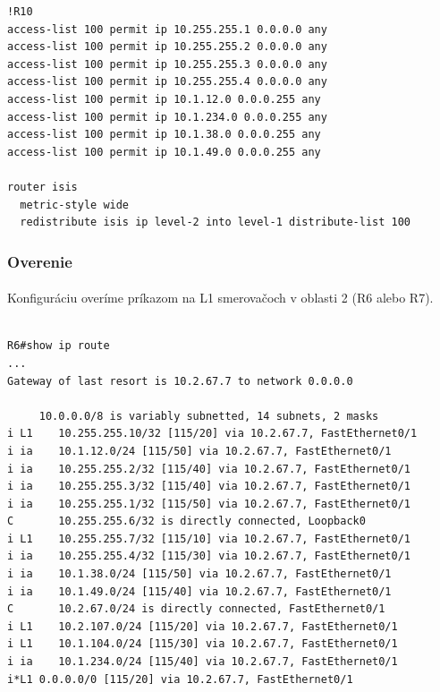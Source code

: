\documentclass[12pt,twoside,a4paper]{report}
\begin{document}
\noindent
{\selectfont
\begin{small}
\begin{verbatim}
!R10
access-list 100 permit ip 10.255.255.1 0.0.0.0 any
access-list 100 permit ip 10.255.255.2 0.0.0.0 any
access-list 100 permit ip 10.255.255.3 0.0.0.0 any
access-list 100 permit ip 10.255.255.4 0.0.0.0 any
access-list 100 permit ip 10.1.12.0 0.0.0.255 any
access-list 100 permit ip 10.1.234.0 0.0.0.255 any
access-list 100 permit ip 10.1.38.0 0.0.0.255 any
access-list 100 permit ip 10.1.49.0 0.0.0.255 any

router isis
  metric-style wide
  redistribute isis ip level-2 into level-1 distribute-list 100
\end{verbatim}
\end{small}
}

\subsubsection{Overenie}
\paragraph{}
Konfiguráciu overíme príkazom  na L1 smerovačoch v oblasti 2 (R6 alebo R7).

\noindent
{\selectfont
\begin{small}
\begin{verbatim}

R6#show ip route
...
Gateway of last resort is 10.2.67.7 to network 0.0.0.0

     10.0.0.0/8 is variably subnetted, 14 subnets, 2 masks
i L1    10.255.255.10/32 [115/20] via 10.2.67.7, FastEthernet0/1
i ia    10.1.12.0/24 [115/50] via 10.2.67.7, FastEthernet0/1
i ia    10.255.255.2/32 [115/40] via 10.2.67.7, FastEthernet0/1
i ia    10.255.255.3/32 [115/40] via 10.2.67.7, FastEthernet0/1
i ia    10.255.255.1/32 [115/50] via 10.2.67.7, FastEthernet0/1
C       10.255.255.6/32 is directly connected, Loopback0
i L1    10.255.255.7/32 [115/10] via 10.2.67.7, FastEthernet0/1
i ia    10.255.255.4/32 [115/30] via 10.2.67.7, FastEthernet0/1
i ia    10.1.38.0/24 [115/50] via 10.2.67.7, FastEthernet0/1
i ia    10.1.49.0/24 [115/40] via 10.2.67.7, FastEthernet0/1
C       10.2.67.0/24 is directly connected, FastEthernet0/1
i L1    10.2.107.0/24 [115/20] via 10.2.67.7, FastEthernet0/1
i L1    10.1.104.0/24 [115/30] via 10.2.67.7, FastEthernet0/1
i ia    10.1.234.0/24 [115/40] via 10.2.67.7, FastEthernet0/1
i*L1 0.0.0.0/0 [115/20] via 10.2.67.7, FastEthernet0/1

\end{verbatim}
\end{small}
}
\end{document}
